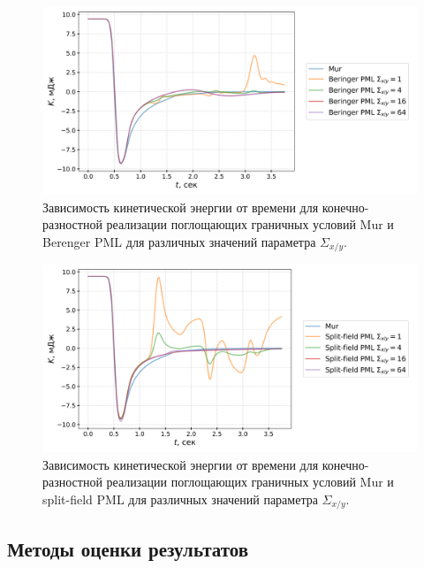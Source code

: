 \begin{figure}[H]
    \centering
    \includegraphics[width=1.0\textwidth]{images/pml/fd_beringer.png}
    \caption{Зависимость кинетической энергии от времени для конечно-разностной реализации поглощающих граничных условий Mur и Berenger PML для различных значений параметра $\Sigma_{x/y}$.}
    \label{fig:fd_Berenger_pml}
\end{figure}
                                                                  
\begin{figure}[H]
    \centering
    \includegraphics[width=1.0\textwidth]{images/pml/fd_split_field.png}
    \caption{Зависимость кинетической энергии от времени для конечно-разностной реализации поглощающих граничных условий Mur и split-field PML для различных значений параметра $\Sigma_{x/y}$.}
    \label{fig:fd_split_field_pml}
\end{figure}

\subsection{Методы оценки результатов}


